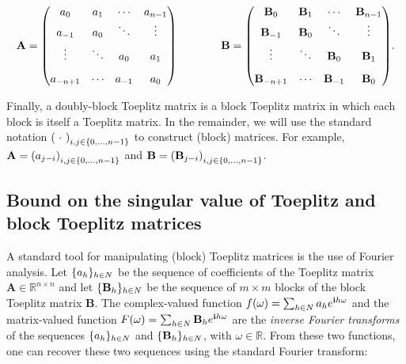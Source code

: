 \begin{equation*}
  \mathbf{A} = \begin{pmatrix}
    a_0 & a_{1} & \cdots & a_{n-1} \\ \vspace{0.1cm}
    a_{-1} & a_0 & \ddots & \vdots \\ \vspace{0.3cm}
   \vdots & \ddots & a_{0} & a_{1} \\ 
  a_{-n+1} & \cdots  & a_{-1}    & a_0 
  \end{pmatrix} \quad \quad \quad \quad 
  \mathbf{B} =\begin{pmatrix}
    \mathbf{B}_0 & \mathbf{B}_{1} & \cdots & \mathbf{B}_{n-1} \\ \vspace{0.1cm}
    \mathbf{B}_{-1} & \mathbf{B}_0 & \ddots & \vdots \\ \vspace{0.3cm}
   \vdots & \ddots & \mathbf{B}_0 & \mathbf{B}_{1} \\ 
  \mathbf{B}_{-n+1} & \cdots  & \mathbf{B}_{-1}    & \mathbf{B}_0 
  \end{pmatrix}.
\end{equation*}

Finally, a doubly-block Toeplitz matrix is a block Toeplitz matrix in which each block is itself a Toeplitz matrix.
In the remainder, we will use the standard notation $\leftmat\ \cdot\ \rightmat_{i,j\in\{0,\ldots,n-1\}}$ to construct (block) matrices.
For example, $\mathbf{A}=\leftmat a_{j-i}\rightmat_{i,j\in\{0,\ldots,n-1\}}$ and $\mathbf{B}=\leftmat\mathbf{B}_{j-i}\rightmat_{i,j\in\{0,\ldots,n-1\}}$.

\subsection{Bound on the singular value of Toeplitz and block Toeplitz matrices}
\label{subsec:generating_function}

A standard tool for manipulating (block) Toeplitz matrices is the use of Fourier analysis.
Let $\{a_h\}_{h \in N}$ be the sequence of coefficients of the Toeplitz matrix $\mathbf{A} \in \mathbb{R}^{n\times n}$ and let $\{\mathbf B_h\}_{h \in N}$ be the sequence of $m\times m$ blocks of the block Toeplitz matrix $\mathbf{B}$.
The complex-valued function $f(\omega) = \sum_{h \in N} a_h e^{\mathbf{i} h \omega}$ and the matrix-valued function $F(\omega) = \sum_{h \in N} \mathbf{B}_h e^{\mathbf{i} h \omega}$ are the \emph{inverse Fourier transforms} of the sequences $\{a_h\}_{h \in N}$ and $\{\mathbf B_h\}_{h \in N}$, with $\omega \in \mathbb{R}$.
From these two functions, one can recover these two sequences using the standard Fourier transform:

